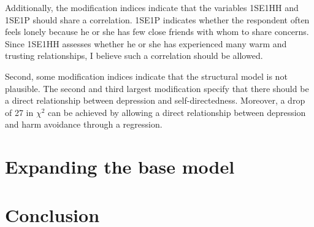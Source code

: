 \documentclass[11pt]{article}
\begin{document}
Additionally, the modification indices indicate that the variables 1SE1HH and 1SE1P should share a correlation.
1SE1P indicates whether the respondent often feels lonely because he or she has few close friends with whom to share concerns.
Since 1SE1HH assesses whether he or she has experienced many warm and trusting relationships, I believe such a correlation should be allowed.

Second, some modification indices indicate that the structural model is not plausible.
The second and third largest modification specify that there should be a direct relationship between depression and self-directedness.
Moreover, a drop of 27 in $\chi^2$ can be achieved by allowing a direct relationship between depression and harm avoidance through a regression.


\FloatBarrier
\pagebreak
\section{Expanding the base model}

\FloatBarrier
\pagebreak
\section{Conclusion}
\end{document}
